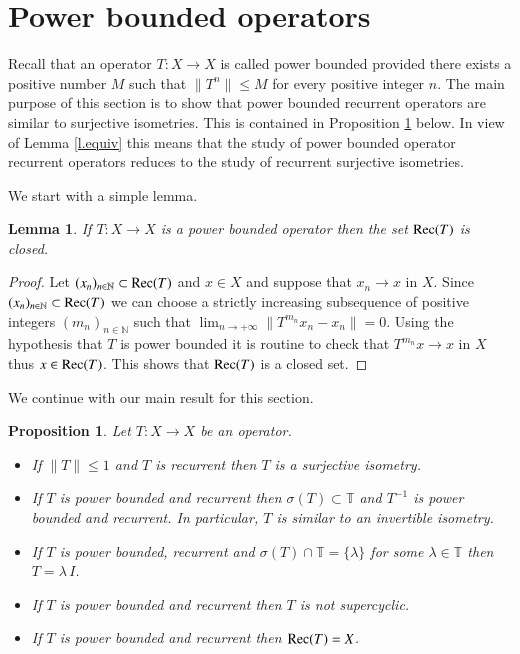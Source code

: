 \documentclass[12pt,leqno]{amsart}
\theoremstyle{plain}
\newtheorem{lemma}[equation]{Lemma}
\newtheorem{proposition}[equation]{Proposition}
\theoremstyle{definition}
\numberwithin{equation}{section}
\begin{document}
\section{Power bounded operators}\label{s.power} Recall that an operator $T:X\to X$ is called power bounded provided there exists a positive number $M$ such that $\| T^n \| \leq M$ for every positive integer $n$. The main purpose of this section is to show that power bounded recurrent operators are similar to surjective isometries. This is contained in Proposition \ref{p.bimpliesunit} below. In view of Lemma \ref{l.equiv} this means that the study of power bounded operator recurrent operators reduces to the study of recurrent surjective isometries.

We start with a simple lemma. 

\begin{lemma}
	\label{l.rec-closed} If $T:X\to X$ is a power bounded operator then the set ${\textnormal{Rec}}(T)$ is closed. 
\end{lemma}

\begin{proof}
	Let $(x_n)_{n\in\mathbb N}\subset {\textnormal{Rec}}(T)$ and $x\in X$ and suppose that $x_n\to x$ in $X$. Since $(x_n)_{n\in\mathbb N}\subset {\textnormal{Rec}}(T)$ we can choose a strictly increasing subsequence of positive integers $(m_n)_{n\in\mathbb N}$ such that $\lim_{n\to +\infty}\|T^{m_n}x_n-x_n\|=0$. Using the hypothesis that $T$ is power bounded it is routine to check that $T^{m_n}x\to x$ in $X$ thus $x\in {\textnormal{Rec}}(T)$. This shows that ${\textnormal{Rec}}(T)$ is a closed set. 
\end{proof}
We continue with our main result for this section.
\begin{proposition}
	\label{p.bimpliesunit} Let $T:X\to X$ be an operator. 
	\begin{itemize}
		\item[(i)] If $\| T\| \leq 1$ and $T$ is recurrent then $T$ is a surjective isometry. 
		\item[(ii)] If $T$ is power bounded and recurrent then $\sigma (T)\subset\mathbb T$ and $T^{-1}$ is power bounded and recurrent. In particular, $T$ is similar to an invertible isometry. 
		\item[(iii)] If $T$ is power bounded, recurrent and $\sigma (T)\cap \mathbb T= \{ \lambda\}$ for some $\lambda \in \mathbb T$ then $T=\lambda\, I$. 
		\item[(iv)] If $T$ is power bounded and recurrent then $T$ is not supercyclic. 
		\item[(v)] If $T$ is power bounded and recurrent then ${\textnormal{Rec}}(T)=X$. 
	\end{itemize}
\end{proposition}
\end{document}
